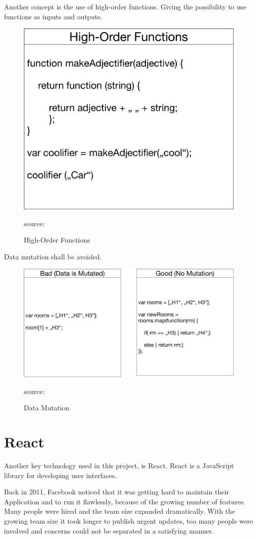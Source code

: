 Another concept is the use of high-order functions. Giving the possibility to use functions as inputs and outputs. 


\begin{figure}[H]
	\centering
	\includegraphics[width=0.5\linewidth]{bilder/grundlagen/fp1.png}
	\caption{High-Order Functions} source:\cite{HF}
	\label{fig:HF}
\end{figure}

Data mutation shall be avoided.

\begin{figure}[H]
	\centering
	\includegraphics[width=\linewidth]{bilder/grundlagen/fp2.png}
	\caption{Data Mutation} source:\cite{DM}
	\label{fig:DM}
\end{figure}

\newpage

\section{React}
Another key technology used in this project, is React. React is a JavaScript library for developing user interfaces. 

Back in 2011, Facebook noticed that it was getting hard to maintain their Application and to run it flawlessly, because of the growing number of features. Many people were hired and the team size expanded dramatically. With the growing team size it took longer to publish urgent updates, too many people were involved and concerns could not be separated in a satisfying manner.

